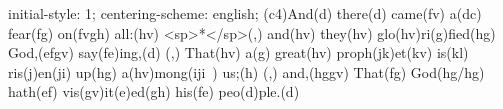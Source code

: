 initial-style: 1;
centering-scheme: english;
(c4)And(d) there(d) came(fv) a(dc) fear(fg) on(fvgh) all:(hv) <sp>*</sp>(,) and(hv) they(hv) glo(hv)ri(g)fied(hg) God,(efgv) say(fe)ing,(d) (,) That(hv) a(g) great(hv) proph(jk)et(kv) is(kl) ris(j)en(ji) up(hg) a(hv)mong(iji~) us;(h) (,) and,(hggv) That(fg) God(hg/hg) hath(ef) vis(gv)it(e)ed(gh) his(fe) peo(d)ple.(d)
